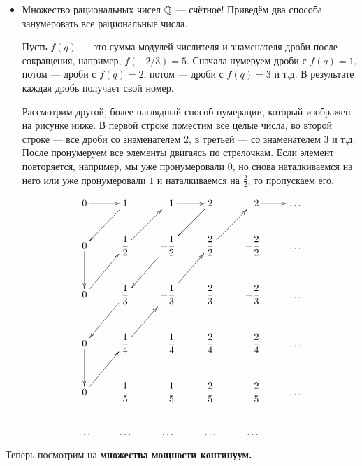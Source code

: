\documentclass[12pt, a4paper]{article}
\begin{document}
\begin{itemize}
\item Множество рациональных чисел $\mathbb Q $ --- счётное! Приведём два способа занумеровать все рациональные числа.

Пусть $ f(q) $ --- это сумма модулей числителя и знаменателя дроби после сокращения, например, $ f(-2/3)=5 $. Сначала нумеруем дроби с $f(q)=1$, потом --- дроби с $ f(q)=2 $, потом --- дроби с $f(q)=3$ и т.д. В результате каждая дробь получает свой номер.

Рассмотрим другой, более наглядный способ нумерации, который изображен на рисунке ниже. В первой строке поместим все целые числа, во второй строке --- все дроби со знаменателем $2$, в третьей --- со знаменателем $3$ и т.д. После пронумеруем все элементы двигаясь по стрелочкам. Если элемент повторяется, например, мы уже пронумеровали $0$, но снова наталкиваемся на него или уже пронумеровали $1$ и наталкиваемся на $\frac{2}{2}$, то пропускаем его.

    \begin{center}
        \[ \xymatrix{
        0 \ar[r] &  1 \ar[ld]  &  -1 \ar[r]  &  2 \ar[ld]  &  -2  \ar[r] & \dots  \\
        0 \ar[d] & \dfrac{1}{2} \ar[ru]  & -\dfrac{1}{2} \ar[ld]  & \dfrac{2}{2} \ar[ur] & -\dfrac{2}{2} &  \dots\\
        0 \ar[ru] & \dfrac{1}{3} \ar[ld] & -\dfrac{1}{3} \ar[ur] & \dfrac{2}{3} & -\dfrac{2}{3}  & \dots \\
        0 \ar[d] & \dfrac{1}{4} \ar[ur] & -\dfrac{1}{4} & \dfrac{2}{4} & -\dfrac{2}{4}  & \dots \\
        0 \ar[ur] & \dfrac{1}{5} & -\dfrac{1}{5} & \dfrac{2}{5} & -\dfrac{2}{5}  & \dots \\
        \dots & \dots & \dots & \dots & \dots  }
        \]
    \end{center}
\end{itemize}

Теперь посмотрим на \textbf{множества мощности континуум.}
\end{document}
